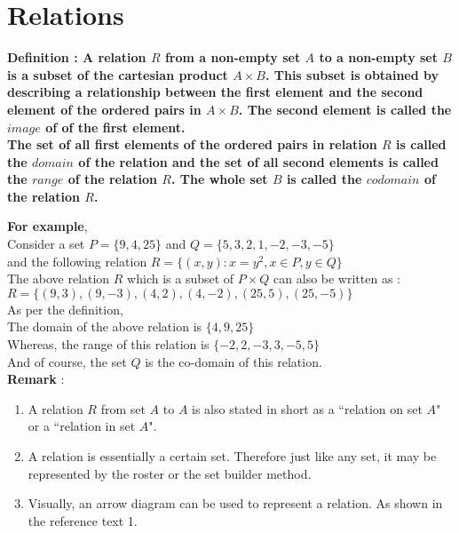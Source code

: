\documentclass[12pt, letterpaper]{article}
\begin{document}
\section{Relations}
\begin{displayquote}
\textbf{Definition : A relation $R$ from a non-empty set $A$ to a non-empty set $B$ is a subset of the cartesian product $A \times B$. This subset is obtained by describing a relationship between the first element and the second element of the ordered pairs in $A \times B$. The second element is called the  $image$ of of the first element.\\
The set of all first elements of the ordered pairs in relation $R$ is called the $domain$ of the relation and the set of all second elements is called the $range$ of the relation $R$. The whole set $B$ is called the $codomain$ of the relation $R$.}
\end{displayquote}
\textbf{For example},\\
 Consider a set $P = \{9,4,25\}$ and $Q = \{5,3,2,1,-2,-3,-5\}$\\
 and the following relation $R = \{(x,y) : x = y^2, x \in P, y \in Q\}$\\
The above relation $R$ which is a subset of $P \times Q$ can also be written as :\\
$R = \{(9,3), (9,-3), (4,2), (4,-2), (25,5), (25,-5)\}$\\
As per the definition, \\
The domain of the above relation is $\{4,9,25\}$\\
Whereas, the range of this relation is $\{-2,2,-3,3,-5,5\}$\\
And of course, the set $Q$ is the co-domain of this relation.\\
\textbf{Remark} : 
\begin{enumerate}
    \item A relation $R$ from set $A$ to $A$ is also stated in short as a ``relation on set $A$" or a ``relation in set $A$".
    \item A relation is essentially a certain set. Therefore just like any set, it may be represented by the roster or the set builder method.
    \item Visually, an arrow diagram can be used to represent a relation. As shown in the reference text 1.
\end{enumerate}
\end{document}
